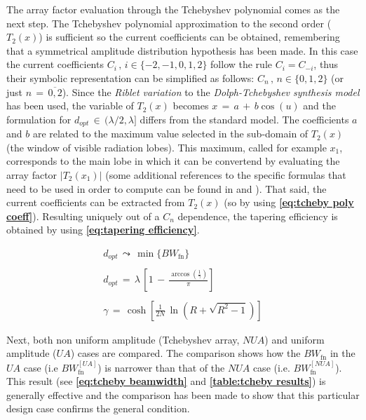 \documentclass[10 pt,a4paper,twocolumn]{article}
\begin{document}
{The array factor evaluation through the Tchebyshev polynomial comes as the next step. The Tchebyshev polynomial approximation to the second order ($T_2(x)$) is sufficient so the current coefficients can be obtained, remembering that a symmetrical amplitude distribution hypothesis has been made. In this case the current coefficients $C_i\,,\,i\in\{-2,-1,0,1,2\}$ follow the rule $C_i=C_{-i}$, thus their symbolic representation can be simplified as follows: $C_n\,,\,n\in\{0,1,2\}$ (or just $n\,=\,\overline{0,2}$). Since the \emph{Riblet variation} to the \emph{Dolph-Tchebyshev synthesis model} has been used, the variable of $T_2(x)$ becomes $x\,=\,a\,+\,b\cos(u)$ and the formulation for $d_{opt}\,\in\,({\lambda}/{2},\lambda]$ differs from the standard model. The coefficients $a$ and $b$ are related to the maximum value selected in the sub-domain of $T_2(x)$ (the window of visible radiation lobes). This maximum, called for example $x_1$, corresponds to the main lobe in which it can be convertend by evaluating the array factor $|T_2(x_1)|$ (some additional references to the specific formulas that need to be used in order to compute can be found in \textbf{\cite{Balanis1}} and \textbf{\cite{ewa}}). That said, the current coefficients can be extracted from $T_2(x)$ (so by using \textbf{\cref{eq:tcheby poly coeff}}). Resulting uniquely out of a $C_n$ dependence, the tapering efficiency is obtained by using \textbf{\cref{eq:tapering efficiency}}.

{\begin{equation}
		\begin{gathered}
			d_{opt}\,{\leadsto}\,\min\{BW_{\operatorname{fn}}\}\\
			\\
			d_{opt}\,{=}\,\lambda\,\left[1\,-\,\frac{\arccos\left(\frac{1}{\gamma}\right)}{\pi}\right]\\
			\\
			\gamma\,{=}\,\cosh\left[\frac{1}{2N}\,\ln\left(R+\sqrt{R^2-1}\right)\right]
		\end{gathered}
		\label{eq:test}
	\end{equation}
}
\indent 

Next, both non uniform amplitude (Tchebyshev array, $NUA$) and uniform amplitude ($UA$)  cases are compared. The comparison shows how the $BW_{\operatorname{fn}}$ in the $UA$ case (i.e $BW_{\operatorname{fn}}^{[UA]}$) is narrower than that of the $NUA$ case (i.e. $BW_{\operatorname{fn}}^{[NUA]}$). This result (see \textbf{\cref{eq:tcheby beamwidth}} and \textbf{\cref{table:tcheby results}}) is generally effective and the comparison has been made to show that this particular design case confirms the general condition. 



}
\end{document}
